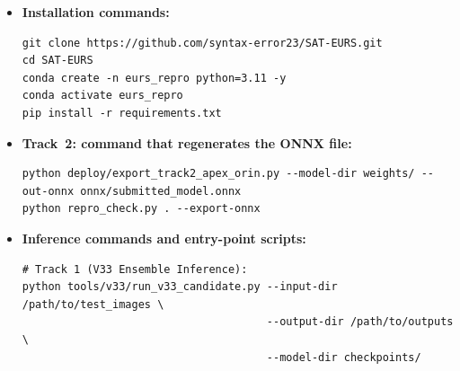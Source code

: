 \documentclass{article}
\begin{document}
\begin{itemize}[leftmargin=*]
\item \textbf{Installation commands:}
\begin{verbatim}
git clone https://github.com/syntax-error23/SAT-EURS.git
cd SAT-EURS
conda create -n eurs_repro python=3.11 -y
conda activate eurs_repro
pip install -r requirements.txt
\end{verbatim}
\item \textbf{Track~2: command that regenerates the ONNX file:}
\begin{verbatim}
python deploy/export_track2_apex_orin.py --model-dir weights/ --out-onnx onnx/submitted_model.onnx
python repro_check.py . --export-onnx
\end{verbatim}
\item \textbf{Inference commands and entry-point scripts:}
\begin{verbatim}
# Track 1 (V33 Ensemble Inference):
python tools/v33/run_v33_candidate.py --input-dir /path/to/test_images \
                                      --output-dir /path/to/outputs \
                                      --model-dir checkpoints/


\end{verbatim}
\end{itemize}
\end{document}

